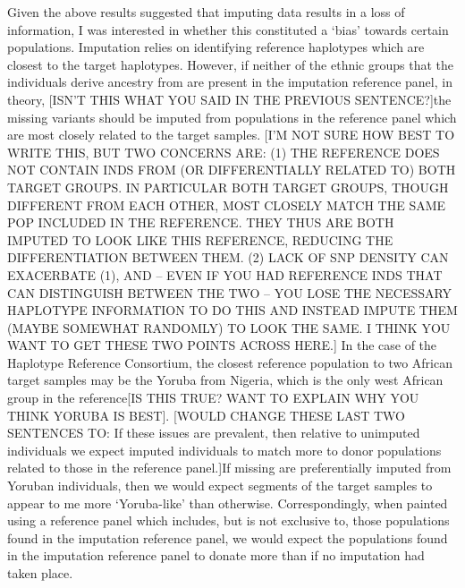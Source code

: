 {Given the above results suggested that imputing data results in a loss of information, I was interested in whether this constituted a `bias' towards certain populations. Imputation relies on identifying reference haplotypes which are closest to the target haplotypes. However, if neither of the ethnic groups that the individuals derive ancestry from are present in the imputation reference panel, in theory, {\color{red}[ISN'T THIS WHAT YOU SAID IN THE PREVIOUS SENTENCE?]the missing variants should be imputed from populations in the reference panel which are most closely related to the target samples}. {\color{red}[I'M NOT SURE HOW BEST TO WRITE THIS, BUT TWO CONCERNS ARE: (1) THE REFERENCE DOES NOT CONTAIN INDS FROM (OR DIFFERENTIALLY RELATED TO) BOTH TARGET GROUPS. IN PARTICULAR BOTH TARGET GROUPS, THOUGH DIFFERENT FROM EACH OTHER, MOST CLOSELY MATCH THE SAME POP INCLUDED IN THE REFERENCE. THEY THUS ARE BOTH IMPUTED TO LOOK LIKE THIS REFERENCE, REDUCING THE DIFFERENTIATION BETWEEN THEM. (2) LACK OF SNP DENSITY CAN EXACERBATE (1), AND -- EVEN IF YOU HAD REFERENCE INDS THAT CAN DISTINGUISH BETWEEN THE TWO -- YOU LOSE THE NECESSARY HAPLOTYPE INFORMATION TO DO THIS AND INSTEAD IMPUTE THEM (MAYBE SOMEWHAT RANDOMLY) TO LOOK THE SAME. I THINK YOU WANT TO GET THESE TWO POINTS ACROSS HERE.]} In the case of the Haplotype Reference Consortium, the closest reference population to two African target samples may be the Yoruba {\color{red}from Nigeria, which is the only west African group in the reference[IS THIS TRUE? WANT TO EXPLAIN WHY YOU THINK YORUBA IS BEST]}. {\color{red}[WOULD CHANGE THESE LAST TWO SENTENCES TO: If these issues are prevalent, then relative to unimputed individuals we expect imputed individuals to match more to donor populations related to those in the reference panel.]If missing are preferentially imputed from Yoruban individuals, then we would expect segments of the target samples to appear to me more `Yoruba-like' than otherwise. Correspondingly, when painted using a reference panel which includes, but is not exclusive to, those populations found in the imputation reference panel, we would expect the populations found in the imputation reference panel to donate more than if no imputation had taken place.}

}
